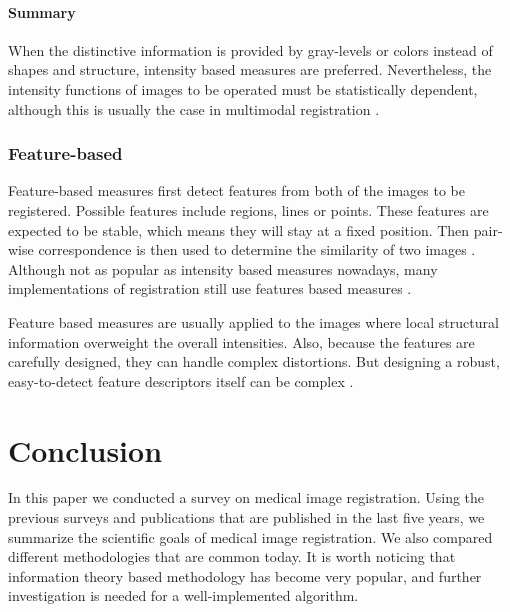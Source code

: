 \documentclass{IEEEtran}
\begin{document}
  \paragraph{Summary}

  When the distinctive information is provided by gray-levels or colors instead of shapes and structure, intensity based measures are preferred. Nevertheless, the intensity functions of images to be operated must be statistically dependent, although this is usually the case in multimodal registration \cite{zitova2003image}.

  \subsubsection{Feature-based}

  Feature-based measures first detect features from both of the images to be registered. Possible features include regions, lines or points. These features are expected to be stable, which means they will stay at a fixed position. Then pair-wise correspondence is then used to determine the similarity of two images \cite{zitova2003image}. Although not as popular as intensity based measures nowadays, many implementations of registration still use features based measures \cite{lu2012non, ong2015robust, economopoulos2014automatic, zhang2014compounding, li2012evaluation, wu2015hierarchical, kim2014hierarchical, biswas2015medical, sergeev2012medical, heinrich2012mind, hu2012mr}.

  Feature based measures are usually applied to the images where local structural information overweight the overall intensities. Also, because the features are carefully designed, they can handle complex distortions. But designing a robust, easy-to-detect feature descriptors itself can be complex \cite{zitova2003image}.

  \section{Conclusion}

  In this paper we conducted a survey on medical image registration. Using the previous surveys and publications that are published in the last five years, we summarize the scientific goals of medical image registration. We also compared different methodologies that are common today. It is worth noticing that information theory based methodology has become very popular, and further investigation is needed for a well-implemented algorithm.



  
  
\end{document}
